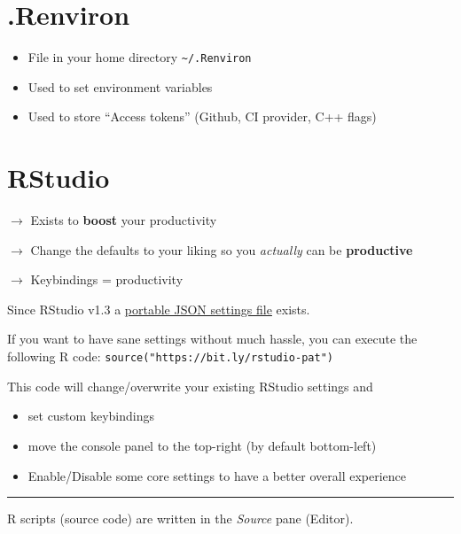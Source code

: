 \documentclass[]{book}
\begin{document}
\hypertarget{renviron}{%
\section{.Renviron}\label{renviron}}

\begin{itemize}
\item
  File in your home directory \texttt{\textasciitilde{}/.Renviron}
\item
  Used to set environment variables
\item
  Used to store ``Access tokens'' (Github, CI provider, C++ flags)
\end{itemize}

\hypertarget{rstudio}{%
\section{RStudio}\label{rstudio}}

\(\rightarrow\) Exists to \textbf{boost} your productivity

\(\rightarrow\) Change the defaults to your liking so you \emph{actually} can be \textbf{productive}

\(\rightarrow\) Keybindings = productivity

Since RStudio v1.3 a \href{https://docs.rstudio.com/ide/desktop-pro/latest/settings.html\#preferences}{portable JSON settings file} exists.

If you want to have sane settings without much hassle, you can execute the following R code: \texttt{source("https://bit.ly/rstudio-pat")}

This code will change/overwrite your existing RStudio settings and

\begin{itemize}
\item
  set custom keybindings
\item
  move the console panel to the top-right (by default bottom-left)
\item
  Enable/Disable some core settings to have a better overall experience
\end{itemize}

\begin{center}\rule{0.5\linewidth}{\linethickness}\end{center}

R scripts (source code) are written in the \emph{Source} pane (Editor).
\end{document}
